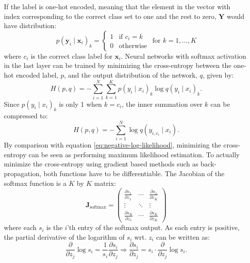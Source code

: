 \documentclass[a4paper,11pt]{article}
\begin{document}
If the label is one-hot encoded, meaning that the element in the vector with index corresponding to the correct class set to one and the rest to zero, $\mathbf{Y}$ would have distribution:
\begin{equation}
  p(\mathbf{y}_i \mid \mathbf{x}_i)_k = \begin{cases}
    1 & \text{if } c_{i} = k \\
    0 & \text{otherwise}
  \end{cases} \hspace{5pt} \text{for } k = 1, \ldots, K
\end{equation}
where $c_i$ is the correct class label for $\mathbf{x}_i$. Neural networks with softmax activation in the last layer can be trained by minimizing the cross-entropy between the one-hot encoded label, $p$, and the output distribution of the network, $q$, given by:
\begin{equation}
  H(p, q) = - \sum_{i=1}^N \sum_{k=1}^K p(y_i \mid x_i)_k \log q(y_i \mid x_i)_k.
\end{equation}
Since $p(y_i \mid x_i)_k$ is only 1 when $k=c_i$, the inner summation over $k$ can be compressed to:
\begin{equation}
  H(p, q) = - \sum_{i=1}^N \log q(y_{i,c_i} \mid x_i).
\end{equation}
By comparison with equation \ref{eq:negative-log-likelihood}, minimizing the cross-entropy can be seen as performing maximum likelihood estimation. To actually minimize the cross-entropy using gradient based methods such as back-propagation, both functions have to be differentiable. The Jacobian of the softmax function is a $K$ by $K$ matrix:
\begin{equation}
  \mathbf{J}_\text{softmax} = \left( 
    \begin{matrix}
      \frac{\partial s_1}{\partial z_1} & \cdots & \frac{\partial s_1}{\partial z_K}\\
      \vdots & \ddots & \vdots \\
      \frac{\partial s_K}{\partial z_1} & \cdots & \frac{\partial s_K}{\partial z_K}
    \end{matrix} 
  \right)
\end{equation}
where each $s_i$ is the $i$'th entry of the softmax output. As each entry is positive, the partial derivative of the logarithm of $s_i$ wrt. $z_i$ can be written as:
\begin{equation} \label{eq:softmax-derivative}
  \frac{\partial}{\partial z_j} \log s_i = \frac{1}{s_i} \frac{\partial s_i}{\partial z_j}
  \Rightarrow \frac{\partial s_i}{\partial z_j} = s_i \cdot \frac{\partial}{\partial z_j} \log s_i.
\end{equation}
\end{document}

